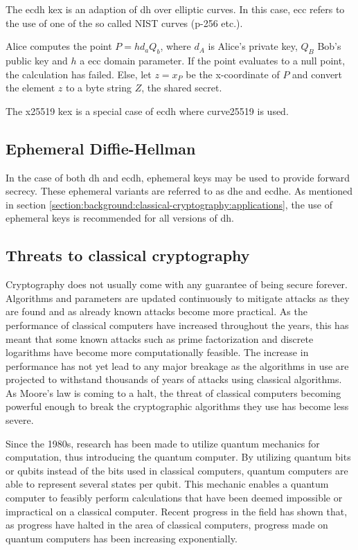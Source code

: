The \gls{ecdh} \gls{kex} is an adaption of \gls{dh} over elliptic curves. In this case, \gls{ecc} refers to the use of one of the so called NIST curves (\gls{p-256} etc.)\cite{nist2018}.

Alice computes the point $P=hd_aQ_b$, where $d_A$ is Alice's private key, $Q_B$ Bob's public key and $h$ a \gls{ecc} domain parameter. If the point evaluates to a null point, the calculation has failed. Else, let $z=x_P$ be the x-coordinate of $P$ and convert the element $z$ to a byte string $Z$, the shared secret.

The \gls{x25519} \gls{kex} is a special case of \gls{ecdh} where \gls{curve25519} is used\cite{rfc7748}. 

\subsection{Ephemeral Diffie-Hellman}

In the case of both \gls{dh} and \gls{ecdh}, ephemeral keys may be used to provide forward secrecy. These ephemeral variants are referred to as \gls{dhe} and \gls{ecdhe}. As mentioned in section \ref{section:background:classical-cryptography:applications}, the use of ephemeral keys is recommended for all versions of \gls{dh}.

\subsection{Threats to classical cryptography}

Cryptography does not usually come with any guarantee of being secure forever. Algorithms and parameters are updated continuously to mitigate attacks as they are found and as already known attacks become more practical\cite{nist2019}. As the performance of classical computers have increased throughout the years, this has meant that some known attacks such as prime factorization and discrete logarithms have become more computationally feasible. The increase in performance has not yet lead to any major breakage as the algorithms in use are projected to withstand thousands of years of attacks using classical algorithms\cite{thome2019}. As Moore's law is coming to a halt\cite{theis2017}, the threat of classical computers becoming powerful enough to break the cryptographic algorithms they use has become less severe.

Since the 1980s, research has been made to utilize quantum mechanics for computation, thus introducing the quantum computer\cite{benioff1980}. By utilizing quantum bits or \glspl{qubit} instead of the bits used in classical computers, quantum computers are able to represent several states per \gls{qubit}. This mechanic enables a quantum computer to feasibly perform calculations that have been deemed impossible or impractical on a classical computer\cite{jordan2021}. Recent progress in the field has shown that, as progress have halted in the area of classical computers, progress made on quantum computers has been increasing exponentially\cite{ibm2020:quantum-computer}.

